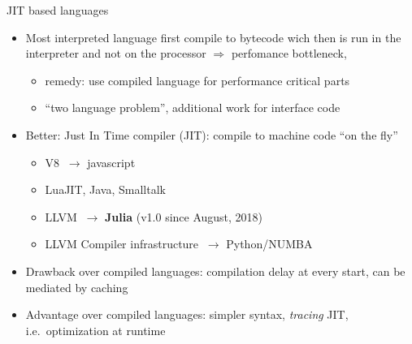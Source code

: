 \begin{frame}{JIT based languages}

  \begin{itemize}
    \tightlist
  \item
    Most interpreted language first compile to
    bytecode wich then is run in the interpreter and not on the processor $\Rightarrow$ perfomance bottleneck,
    \begin{itemize}
      \tightlist
    \item  remedy: use compiled language  for performance critical parts
    \item  ``two language problem'', additional work for interface code
    \end{itemize}
  \item Better: Just In Time compiler (JIT): compile to machine code ``on the fly''
    \begin{itemize}
      \tightlist
    \item
      V8 \(~\to\) javascript
    \item
      LuaJIT, Java, Smalltalk
    \item   LLVM    \(~\to\)   \textbf{Julia} (v1.0 since August, 2018)
    \item
      LLVM Compiler infrastructure \(~\to\) Python/NUMBA
    \end{itemize}
  \item
    Drawback over compiled languages: compilation delay at every start,
    can be mediated by caching
  \item
    Advantage over compiled languages: simpler syntax, \emph{tracing} JIT,
    i.e.~optimization at runtime
\end{itemize}
\vfill



\end{frame}


